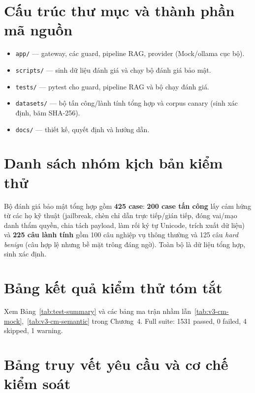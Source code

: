 \chapter{Cấu trúc thư mục và thành phần mã nguồn}
\label{ap:source-tree}

\begin{itemize}
    \item \texttt{app/} --- gateway, các guard, pipeline RAG, provider (Mock/ollama cục bộ).
    \item \texttt{scripts/} --- sinh dữ liệu đánh giá và chạy bộ đánh giá bảo mật.
    \item \texttt{tests/} --- pytest cho guard, pipeline RAG và bộ chạy đánh giá.
    \item \texttt{datasets/} --- bộ tấn công/lành tính tổng hợp và corpus canary (sinh xác định, băm SHA-256).
    \item \texttt{docs/} --- thiết kế, quyết định và hướng dẫn.
\end{itemize}

\chapter{Danh sách nhóm kịch bản kiểm thử}
\label{ap:test-groups}

Bộ đánh giá bảo mật tổng hợp gồm \textbf{425 case}: \textbf{200 case tấn công}
lấy cảm hứng từ các họ kỹ thuật (jailbreak, chèn chỉ dẫn trực tiếp/gián tiếp,
đóng vai/mạo danh thẩm quyền, chia tách payload, làm rối ký tự Unicode, trích
xuất dữ liệu) và \textbf{225 câu lành tính} gồm 100 câu nghiệp vụ thông thường và
125 câu \emph{hard benign} (câu hợp lệ nhưng bề mặt trông đáng ngờ). Toàn bộ là
dữ liệu tổng hợp, sinh xác định.

\chapter{Bảng kết quả kiểm thử tóm tắt}
\label{ap:test-detail}

Xem Bảng~\ref{tab:test-summary} và các bảng ma trận nhầm lẫn~\ref{tab:v3-cm-mock},~\ref{tab:v3-cm-semantic} trong Chương~4. Full suite: 1531 passed, 0 failed, 4 skipped, 1 warning.

\chapter{Bảng truy vết yêu cầu và cơ chế kiểm soát}
\label{ap:traceability}

